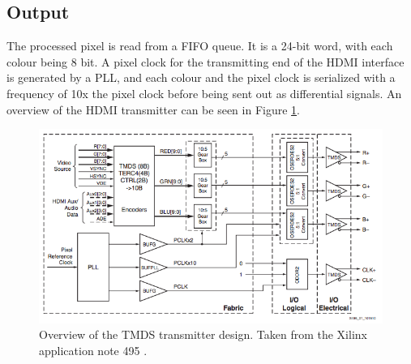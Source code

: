 \subsection{Output}
The processed pixel is read from a FIFO queue. It is a 24-bit word, with each colour being 8 bit.
A pixel clock for the transmitting end of the HDMI interface is generated by a PLL,
and each colour and the pixel clock is serialized with a frequency of 10x the pixel clock before being sent out as differential signals.
An overview of the HDMI transmitter can be seen in Figure \ref{fig:TMDSTransmitter}.

\begin{figure}[h!]
    \centering
    \includegraphics[width=\linewidth]{img/TMDStransmitterdesign.png}
    \caption[Overview of the TMDS transmitter design.]{Overview of the TMDS transmitter design. Taken from the Xilinx application note 495 \cite{xapp495}.}
    \label{fig:TMDSTransmitter}
\end{figure}

